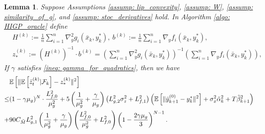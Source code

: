 \documentclass{article}
\theoremstyle{plain}
\newtheorem{lemma}[theorem]{Lemma}
\theoremstyle{definition}
\theoremstyle{remark}
\newcommand{\E}{\mathbb{E}}
\newcommand{\F}{\mathcal{F}}
\begin{document}
\begin{lemma}\label{lem: higp_main}
    Suppose Assumptions \ref{assump: lip_convexity}, \ref{assump: W}, \ref{assump: similarity_of_g}, and \ref{assump: stoc_derivatives} hold. In Algorithm \ref{algo: HIGP_oracle} define
    \begin{align*}
        &H^{(k)} := \frac{1}{n}\sum_{i=1}^{n}\nabla_y^2g_i(\bar{x}_k,y_k^*),\ b^{(k)} := \frac{1}{n}\sum_{i=1}^{n}\nabla_y f_i(\bar{x}_k, y_k^*), \\
        &z_{*}^{(k)} := \left(H^{(k)}\right)^{-1}\cdot b^{(k)} = \left(\sum_{i=1}^{n}\nabla_y^2g_i(\bar{x}_k,y_k^*)\right)^{-1}\left(\sum_{i=1}^{n}\nabla_y f_i(\bar{x}_k, y_k^*)\right),
    \end{align*}
    If $\gamma$ satisfies \eqref{ineq: gamma_for_quadratics}, then we have
    \begin{align}
        &\E\left[\|\E\left[\bar{z}_{t}^{(k)}|\F_k\right] - z_{*}^{(k)}\|^2\right] \notag\\
        \leq &(1-\gamma\mu_g)^{N}\cdot\frac{L_{f,0}^2}{\mu_g^2} + 5\left(\frac{1}{\mu_g^2} + \frac{\gamma}{\mu_g}\right)\left(L_{g,2}^2\sigma_z^2 + L_{f,1}^2\right)\left(\E\left[\|\bar{y}_{k+1}^{(0)} - y_k^*\|^2\right] + \sigma_x^2\tilde{\alpha}_k^2 + T\tilde{\beta}_{k+1}^2\right) \notag \\
            + &90C_{\tilde{M}}L_{g,1}^2\left(\frac{1}{\mu_g^2} + \frac{\gamma}{\mu_g}\right)\left(\frac{L_{f,0}^2}{\mu_g^2} +L_{f,0}^2\right)\left(1-\frac{2\gamma\mu_g}{3}\right)^{N-1}. \label{ineq: z_conv_higp}
    \end{align}
\end{lemma}
\end{document}
